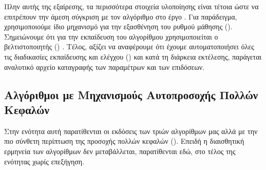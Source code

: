 Πλην αυτής της εξαίρεσης, τα περισσότερα στοιχεία υλοποίησης είναι τέτοια ώστε να επιτρέπουν την άμεση σύγκριση με τον αλγόριθμο στο έργο \cite{sabour2017dynamic}. Για παράδειγμα, χρησιμοποιούμε ίδιο μηχανισμό για την εξασθένηση του ρυθμού μάθησης (). Σημειώνουμε ότι για την εκπαίδευση του αλγορίθμου χρησιμοποιείται ο βελτιστοποιητής () . Τέλος, αξίζει να αναφέρουμε ότι έχουμε αυτοματοποιήσει όλες τις διαδικασίες εκπαίδευσης και ελέγχου () και κατά τη διάρκεια εκτέλεσης, παράγεται αναλυτικό αρχείο καταγραφής των παραμέτρων και των επιδόσεων.

\subsection{Αλγόριθμοι με Μηχανισμούς Αυτοπροσοχής Πολλών Κεφαλών}
Στην ενότητα αυτή παρατίθενται οι εκδόσεις των τριών αλγορίθμων μας αλλά με την πιο σύνθετη περίπτωση της προσοχής πολλών κεφαλών (). Επειδή η διαισθητική ερμηνεία των αλγορίθμων δεν μεταβάλλεται, παρατίθενται εδώ, στο τέλος της ενότητας χωρίς επεξήγηση.

